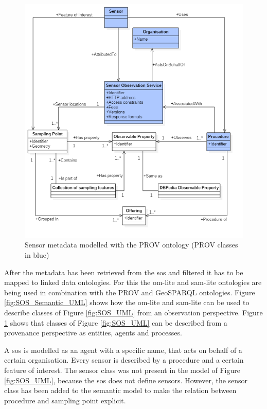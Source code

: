 \begin{figure}
	\centering
	\includegraphics[width=1\linewidth]{UML/SOS_Semantic_UML_3.PNG}
	\caption{Sensor metadata modelled with the PROV ontology (PROV classes in blue)}
	\label{fig:SOS_Semantic_UML2}
\end{figure}

After the metadata has been retrieved from the \ac{sos} and filtered it has to be mapped to linked data ontologies. For this the om-lite and sam-lite ontologies are being used in combination with the PROV and GeoSPARQL ontologies. Figure \ref{fig:SOS_Semantic_UML} shows how the om-lite and sam-lite can be used to describe classes of Figure \ref{fig:SOS_UML} from an observation perspective. Figure \ref{fig:SOS_Semantic_UML2} shows that classes of Figure \ref{fig:SOS_UML} can be described from a provenance perspective as entities, agents and processes.     

A \ac{sos} is modelled as an agent with a specific name, that acts on behalf of a certain organisation. Every sensor is described by a procedure and a certain feature of interest. The sensor class was not present in the model of Figure \ref{fig:SOS_UML}, because the \ac{sos} does not define sensors. However, the sensor class has been added to the semantic model to make the relation between procedure and sampling point explicit. 

